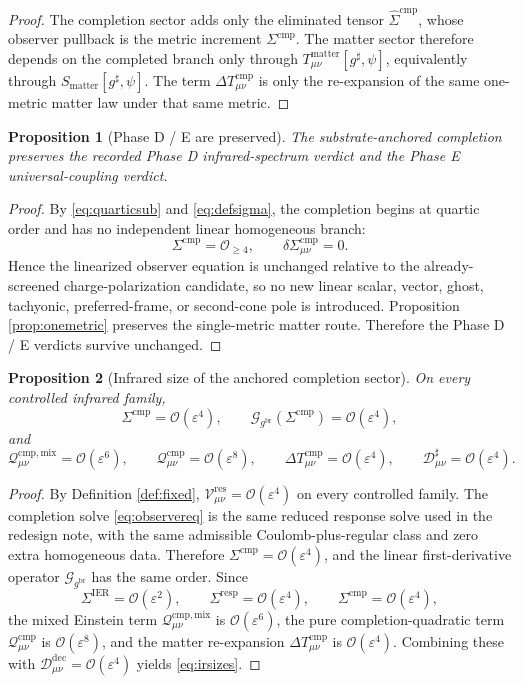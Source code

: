 \documentclass[11pt]{article}
\newcommand{\ObserverMetric}{g^{\mathrm{br}}}
\newcommand{\CompletedMetric}{g^{\sharp}}
\newcommand{\BaseShift}{\Sigma^{\mathrm{IER}}}
\newcommand{\ResponseShift}{\Sigma^{\mathrm{resp}}}
\newcommand{\CompShift}{\Sigma^{\mathrm{cmp}}}
\newcommand{\CompLift}{\widehat\Sigma^{\mathrm{cmp}}}
\newcommand{\ResidualCore}{\mathcal V_{\mu\nu}^{\mathrm{res}}}
\newcommand{\ResidualDec}{\mathcal D_{\mu\nu}^{\mathrm{dec}}}
\newcommand{\GaugeBook}{\mathcal G_{\ObserverMetric}}
\newcommand{\CompMix}{\mathcal Q_{\mu\nu}^{\mathrm{cmp,mix}}}
\newcommand{\CompQuad}{\mathcal Q_{\mu\nu}^{\mathrm{cmp}}}
\newcommand{\CompDec}{\mathcal D_{\mu\nu}^{\sharp}}
\newcommand{\DeltaTComp}{\Delta T_{\mu\nu}^{\mathrm{cmp}}}
\newcommand{\MatterAct}{S_{\mathrm{matter}}}
\newcommand{\epsIR}{\varepsilon}
\newtheorem{proposition}{Proposition}
\begin{document}
\begin{proof}
The completion sector adds only the eliminated tensor \(\CompLift\), whose observer pullback is the metric increment \(\CompShift\). The matter sector therefore depends on the completed branch only through \(T_{\mu\nu}^{\mathrm{matter}}[\CompletedMetric,\psi]\), equivalently through \(\MatterAct[\CompletedMetric,\psi]\). The term \(\DeltaTComp\) is only the re-expansion of the same one-metric matter law under that same metric.
\end{proof}

\begin{proposition}[Phase D / E are preserved]
\label{prop:phaseDE}
The substrate-anchored completion preserves the recorded Phase D infrared-spectrum verdict and the Phase E universal-coupling verdict.
\end{proposition}

\begin{proof}
By \eqref{eq:quarticsub} and \eqref{eq:defsigma}, the completion begins at quartic order and has no independent linear homogeneous branch:
\[
\CompShift=\mathcal O_{\ge 4},
\qquad
\delta\CompShift_{\mu\nu}=0.
\]
Hence the linearized observer equation is unchanged relative to the already-screened charge-polarization candidate, so no new linear scalar, vector, ghost, tachyonic, preferred-frame, or second-cone pole is introduced. Proposition \ref{prop:onemetric} preserves the single-metric matter route. Therefore the Phase D / E verdicts survive unchanged.
\end{proof}

\begin{proposition}[Infrared size of the anchored completion sector]
\label{prop:size}
On every controlled infrared family,
\begin{equation}
\CompShift=\mathcal O(\epsIR^4),
\qquad
\GaugeBook(\CompShift)=\mathcal O(\epsIR^4),
\label{eq:ircomp}
\end{equation}
and
\begin{equation}
\CompMix=\mathcal O(\epsIR^6),
\qquad
\CompQuad=\mathcal O(\epsIR^8),
\qquad
\DeltaTComp=\mathcal O(\epsIR^4),
\qquad
\CompDec=\mathcal O(\epsIR^4).
\label{eq:irsizes}
\end{equation}
\end{proposition}

\begin{proof}
By Definition \ref{def:fixed}, \(\ResidualCore=\mathcal O(\epsIR^4)\) on every controlled family. The completion solve \eqref{eq:observereq} is the same reduced response solve used in the redesign note, with the same admissible Coulomb-plus-regular class and zero extra homogeneous data. Therefore \(\CompShift=\mathcal O(\epsIR^4)\), and the linear first-derivative operator \(\GaugeBook\) has the same order. Since
\[
\BaseShift=\mathcal O(\epsIR^2),
\qquad
\ResponseShift=\mathcal O(\epsIR^4),
\qquad
\CompShift=\mathcal O(\epsIR^4),
\]
the mixed Einstein term \(\CompMix\) is \(\mathcal O(\epsIR^6)\), the pure completion-quadratic term \(\CompQuad\) is \(\mathcal O(\epsIR^8)\), and the matter re-expansion \(\DeltaTComp\) is \(\mathcal O(\epsIR^4)\). Combining these with \(\ResidualDec=\mathcal O(\epsIR^4)\) yields \eqref{eq:irsizes}.
\end{proof}
\end{document}
